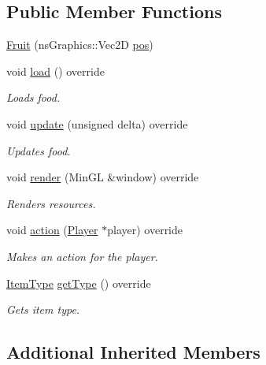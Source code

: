 \subsection*{Public Member Functions}
\begin{DoxyCompactItemize}
\item 
\hyperlink{classns_game_1_1_fruit_a3d8e8a000d60e2d1f71ebd1820dd6667}{Fruit} (ns\+Graphics\+::\+Vec2D \hyperlink{structns_game_1_1_item_a5518876a13f3d2eda659d29748097f1a}{pos})
\item 
void \hyperlink{classns_game_1_1_fruit_a28c4ae21607dbad699602528c6ffc583}{load} () override
\begin{DoxyCompactList}\small\item\em Loads food. \end{DoxyCompactList}\item 
void \hyperlink{classns_game_1_1_fruit_adade5568e2f552576d0d32b714b9ac02}{update} (unsigned delta) override
\begin{DoxyCompactList}\small\item\em Updates food. \end{DoxyCompactList}\item 
void \hyperlink{classns_game_1_1_fruit_a99622754f8cf90bb285b4808e98372c7}{render} (Min\+GL \&window) override
\begin{DoxyCompactList}\small\item\em Renders resources. \end{DoxyCompactList}\item 
void \hyperlink{classns_game_1_1_fruit_ad33836a67756dba7390b95c57898e91c}{action} (\hyperlink{classns_game_1_1_player}{Player} $\ast$player) override
\begin{DoxyCompactList}\small\item\em Makes an action for the player. \end{DoxyCompactList}\item 
\hyperlink{namespacens_game_a5f7db01e6447720e9a145f0b3c68a4d7}{Item\+Type} \hyperlink{classns_game_1_1_fruit_a4d704f296f536afc2980183bb21e4c62}{get\+Type} () override
\begin{DoxyCompactList}\small\item\em Gets item type. \end{DoxyCompactList}\end{DoxyCompactItemize}
\subsection*{Additional Inherited Members}


